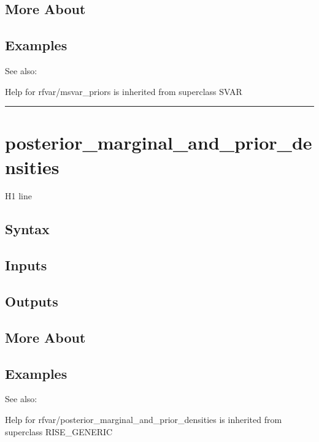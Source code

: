 \documentclass[letterpaper,10pt,english]{sphinxmanual}
\begin{document}
\subsection{More About}
\label{classes/models/@rfvar/rfvar:id77}

\subsection{Examples}
\label{classes/models/@rfvar/rfvar:id78}
See also:

Help for rfvar/msvar\_priors is inherited from superclass SVAR


\bigskip\hrule{}\bigskip



\section{posterior\_marginal\_and\_prior\_densities}
\label{classes/models/@rfvar/rfvar:id79}\label{classes/models/@rfvar/rfvar:posterior-marginal-and-prior-densities}
H1 line


\subsection{Syntax}
\label{classes/models/@rfvar/rfvar:id80}

\subsection{Inputs}
\label{classes/models/@rfvar/rfvar:id81}

\subsection{Outputs}
\label{classes/models/@rfvar/rfvar:id82}

\subsection{More About}
\label{classes/models/@rfvar/rfvar:id83}

\subsection{Examples}
\label{classes/models/@rfvar/rfvar:id84}
See also:

Help for rfvar/posterior\_marginal\_and\_prior\_densities is inherited from superclass RISE\_GENERIC
\end{document}
